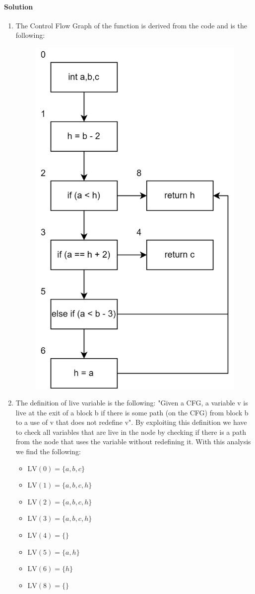 \paragraph*{Solution}
\begin{enumerate}
    \item The Control Flow Graph of the function is derived from the code and is the following: 
        \begin{figure}[H]
            \centering
            \includegraphics[width=0.4\linewidth]{images/cfg.png}
        \end{figure}
    \item The definition of live variable is the following: "Given a CFG, a variable v is live at the exit of a block b if there is some path (on the CFG) from block b to a use of v that does not redefine v". 
        By exploiting this definition we have to check all variables that are live in the node by checking if there is a path from the node that uses the variable without redefining it. 
        With this analysis we find the following: 
        \begin{itemize}
            \item $\text{LV}(0) = \{a,b,c\}$
            \item $\text{LV}(1) = \{a,b,c,h\}$
            \item $\text{LV}(2) = \{a,b,c,h\}$
            \item $\text{LV}(3) = \{a,b,c,h\}$ 
            \item $\text{LV}(4) = \{ \}$ 
            \item $\text{LV}(5) = \{a,h\}$ 
            \item $\text{LV}(6) = \{h\}$ 
            \item $\text{LV}(8) = \{ \}$

\end{itemize}
\end{enumerate}
